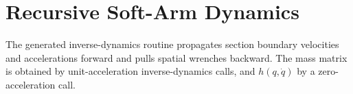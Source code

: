 \documentclass{article}
\begin{document}
\section*{Recursive Soft-Arm Dynamics}
The generated inverse-dynamics routine propagates section boundary velocities and accelerations forward and pulls spatial wrenches backward. The mass matrix is obtained by unit-acceleration inverse-dynamics calls, and $h(q,\dot q)$ by a zero-acceleration call.
\end{document}
